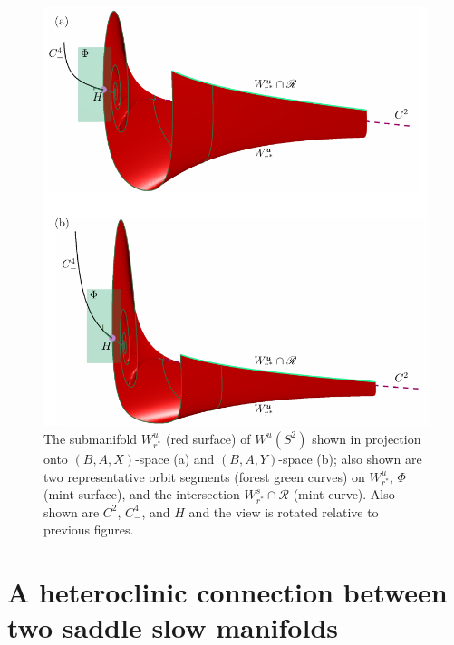 \documentclass{ws-ijbc}
\begin{document}
\begin{figure}[H]
\centering
\includegraphics[]{./figures/MKMO_7.pdf}
\caption{The submanifold $W^u_{r^*}$ (red surface) of $W^u(S^2)$ shown in projection onto $(B,A,X)$-space (a) and $(B,A,Y)$-space (b); also shown are two representative orbit segments (forest green curves) on $W^u_{r^*}$, $\Phi$ (mint surface), and the intersection $W^s_{r^*}\cap\mathscr{R}$ (mint curve).  Also shown are $C^2$, $C^4_-$, and $H$ and the view is rotated relative to previous figures.}
\label{figure_7}
\end{figure}



\section{A heteroclinic connection between two saddle slow manifolds}
\end{document}
